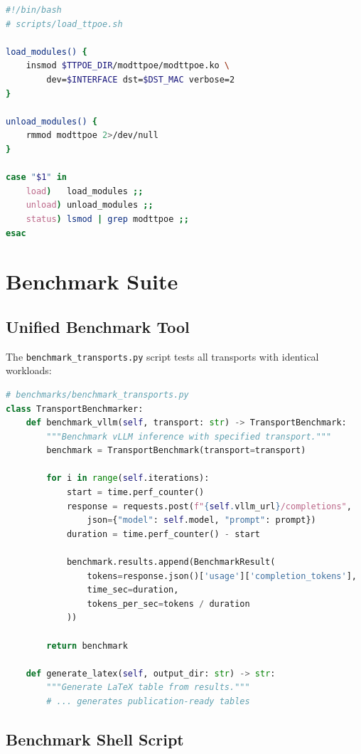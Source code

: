 \documentclass[10pt,letterpaper]{article}
\begin{document}
\begin{lstlisting}[language=bash]
#!/bin/bash
# scripts/load_ttpoe.sh

load_modules() {
    insmod $TTPOE_DIR/modttpoe/modttpoe.ko \
        dev=$INTERFACE dst=$DST_MAC verbose=2
}

unload_modules() {
    rmmod modttpoe 2>/dev/null
}

case "$1" in
    load)   load_modules ;;
    unload) unload_modules ;;
    status) lsmod | grep modttpoe ;;
esac
\end{lstlisting}

\section{Benchmark Suite}

\subsection{Unified Benchmark Tool}

The \texttt{benchmark\_transports.py} script tests all transports with identical workloads:

\begin{lstlisting}[language=Python]
# benchmarks/benchmark_transports.py
class TransportBenchmarker:
    def benchmark_vllm(self, transport: str) -> TransportBenchmark:
        """Benchmark vLLM inference with specified transport."""
        benchmark = TransportBenchmark(transport=transport)

        for i in range(self.iterations):
            start = time.perf_counter()
            response = requests.post(f"{self.vllm_url}/completions",
                json={"model": self.model, "prompt": prompt})
            duration = time.perf_counter() - start

            benchmark.results.append(BenchmarkResult(
                tokens=response.json()['usage']['completion_tokens'],
                time_sec=duration,
                tokens_per_sec=tokens / duration
            ))

        return benchmark

    def generate_latex(self, output_dir: str) -> str:
        """Generate LaTeX table from results."""
        # ... generates publication-ready tables
\end{lstlisting}

\subsection{Benchmark Shell Script}
\end{document}
